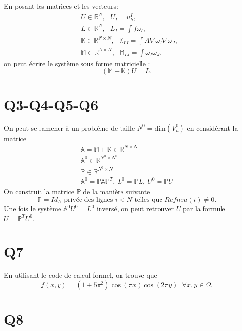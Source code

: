 \documentclass[11pt]{article}
\newcommand{\Am}{\mathbb{A}}
\renewcommand{\P}{\mathbb{P}}
\newcommand{\R}{\mathbb{R}}
\newcommand{\K}{\mathbb{K}}
\newcommand{\M}{\mathbb{M}}
\newcommand{\ms}{~~~}
\begin{document}
En posant les matrices et les vecteurs:
\begin{align}
  &U \in \R^{N}, \ms U_{I} = u_h^I, \\
  &L \in \R^{N}, \ms L_{I} = \int f \omega_I, \\
  &\K \in \R^{N\times N},\ms \K_{IJ} = \int A \nabla \omega_I \nabla \omega_J,  \\
  &\M \in \R^{N\times N},\ms \M_{IJ} = \int \omega_I \omega_J,
\end{align}
on peut écrire le système sous forme matricielle :
\begin{equation}
  (\M+\K) U = L.
\end{equation}


\section{Q3-Q4-Q5-Q6} 

On peut se ramener à un problème de taille $N^0 = \mbox{dim}(V^0_h)$ en considérant la matrice
\begin{gather}
  \Am = \M + \K \in \R^{N\times N } \\
  \Am^0 \in \R^{N^0\times N^0} \\
  \P \in \R^{N^0\times N} \\
  \Am^0 = \P\Am\P^T, ~ L^0 = \P L, ~ U^0 = \P U 
\end{gather} 
On construit la matrice $\P$ de la manière suivante
\begin{equation}
  \P = Id_N \mbox{~privée des lignes $i<N$ telles que $Refneu(i)\neq 0$.}
\end{equation}
Une fois le système $\Am^0 U^0 = L^0$ inversé, on peut retrouver $U$ par la formule $U=\P^T U^0$.

\section{Q7}

En utilisant le code de calcul formel, on trouve que
\begin{equation}
  f(x,y) = (1+5\pi^2)\cos(\pi x)\cos(2\pi y) \ms \forall x,y\in\Omega.
\end{equation}

\section{Q8}
\end{document}
